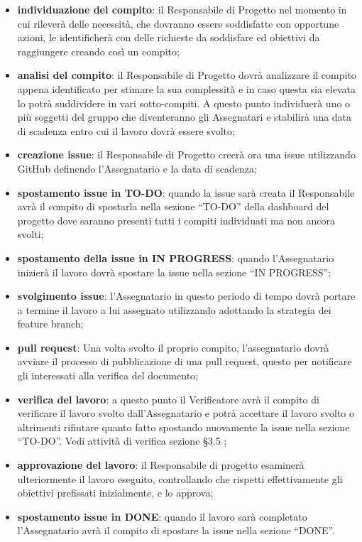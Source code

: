 			\begin{itemize}
				\item\textbf{individuazione del compito}: il Responsabile di Progetto nel momento in cui rileverà delle necessità, che dovranno essere soddisfatte con opportune azioni, le identificherà con delle richieste da soddisfare ed obiettivi da raggiungere creando così un compito;
				\item\textbf{analisi del compito}: il Responsabile di Progetto dovrà analizzare il compito appena identificato per stimare la sua complessità e in caso questa sia elevata lo potrà suddividere in vari sotto-compiti. A questo punto individuerà uno o più soggetti del gruppo che diventeranno gli Assegnatari e stabilirà una data di scadenza entro cui il lavoro dovrà essere svolto;
				\item\textbf{creazione issue}: il Responsabile di Progetto creerà ora una issue utilizzando GitHub definendo l’Assegnatario e la data di scadenza;
				\item\textbf{spostamento issue in TO-DO}: quando la issue sarà creata il Responsabile avrà il compito di spostarla nella sezione “TO-DO” della dashboard del progetto dove saranno presenti tutti i compiti individuati ma non ancora svolti; 
				\item\textbf{spostamento della issue in IN PROGRESS}: quando l’Assegnatario inizierà il lavoro dovrà spostare la issue nella sezione “IN PROGRESS”;
				\item\textbf{svolgimento issue}: l’Assegnatario in questo periodo di tempo dovrà portare a termine il lavoro a lui assegnato utilizzando adottando la strategia dei feature branch;
				\item\textbf{pull request}: Una volta svolto il proprio compito, l'assegnatario dovrà avviare il processo di pubblicazione di una pull request, questo per notificare gli interessati alla verifica del documento;
				\item\textbf{verifica del lavoro}: a questo punto il Verificatore avrà il compito di verificare il lavoro svolto dall’Assegnatario e potrà accettare il lavoro svolto o altrimenti rifiutare quanto fatto spostando nuovamente la issue nella sezione “TO-DO”. Vedi attività di verifica sezione §3.5 ;
				\item\textbf{approvazione del lavoro}: il Responsabile di progetto esaminerà ulteriormente il lavoro eseguito, controllando che rispetti effettivamente gli obiettivi prefissati inizialmente, e lo approva;
				\item\textbf{spostamento issue in DONE}: quando il lavoro sarà completato l’Assegnatario avrà il compito di spostare la issue nella sezione “DONE”.
			\end{itemize}
